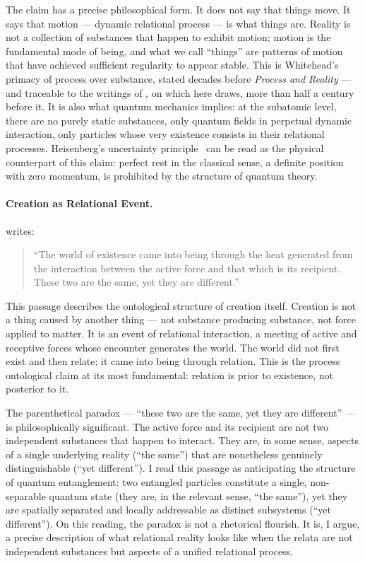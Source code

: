The claim has a precise philosophical form.
It does not say that things move.
It says that motion --- dynamic relational process --- is what things are.
Reality is not a collection of substances that happen to exhibit motion;
motion is the fundamental mode of being, and what we call ``things'' are
patterns of motion that have achieved sufficient regularity to appear
stable.
This is Whitehead's primacy of process over substance, stated decades
before \textit{Process and Reality} --- and traceable to the writings
of \Bahaullah, on which \AbdulBaha here draws, more than half a century
before it.
It is also what quantum mechanics implies: at the subatomic level, there
are no purely static substances, only quantum fields in perpetual dynamic
interaction, only particles whose very existence consists in their
relational processes.
Heisenberg's uncertainty principle~\citeyearpar{Heisenberg1927} can be
read as the physical counterpart of this claim: perfect rest in the classical sense, a definite position with zero momentum, is prohibited by the structure of quantum theory.

\paragraph{Creation as Relational Event.}
\Bahaullah writes:
\begin{quote}
``The world of existence came into being through the heat generated
from the interaction between the active force and that which is its recipient.
These two are the same, yet they are different.''
\citep[p.~140]{TabletsBahaullah}
\end{quote}

This passage describes the ontological structure of creation itself.
Creation is not a thing caused by another thing --- not substance producing
substance, not force applied to matter.
It is an event of relational interaction, a meeting of active and
receptive forces whose encounter generates the world.
The world did not first exist and then relate; it came into being through
relation.
This is the process ontological claim at its most fundamental: relation
is prior to existence, not posterior to it.

The parenthetical paradox --- ``these two are the same, yet they are
different'' --- is philosophically significant.
The active force and its recipient are not two independent substances
that happen to interact.
They are, in some sense, aspects of a single underlying reality
(``the same'') that are nonetheless genuinely distinguishable
(``yet different'').
I read this passage as anticipating the structure of quantum entanglement:
two entangled particles constitute a single, non-separable quantum state
(they are, in the relevant sense, ``the same''), yet they are spatially
separated and locally addressable as distinct subsystems (``yet different'').
On this reading, the paradox is not a rhetorical flourish.
It is, I argue, a precise description of what relational reality looks like
when the relata are not independent substances but aspects of a unified
relational process.

